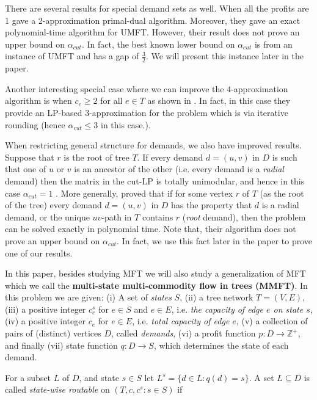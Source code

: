 There are several results for special demand sets as well. When all the profits are 1 \cite{Garg1997} gave a 2-approximation primal-dual algorithm. Moreover, they gave an exact polynomial-time algorithm for UMFT. However, their result does not prove an upper bound on $\alpha_{cut}$. In fact, the best known lower  bound on  $\alpha_{cut}$ is from an instance of UMFT and has a gap of $\frac{3}{2}$.  We will present this instance later in the paper. 

Another interesting special case where we can improve the $4$-approximation algorithm is when $c_e\geq 2$ for all $e\in T$ as shown in \cite{ojas1}. In fact, in this case they provide an LP-based $3$-approximation for the problem which is via iterative rounding (hence $\alpha_{cut}\leq 3$ in this case.). 

When restricting general structure for demands, we also have improved results. Suppose that $r$ is the root of tree $T$. If every demand $d=(u,v)$ in $D$ is such that one of $u$ or $v$ is an ancestor of the other (i.e. every demand is a \textit{radial} demand) then the matrix in the cut-LP is totally unimodular, and hence in this case $\alpha_{cut} =1$ \cite{IPbook}. More generally, \cite{ojas1} proved that if for some vertex $r$ of $T$ (as the root of the tree) every demand $d=(u,v)$ in $D$ has the property that $d$ is a radial demand, or the unique $uv$-path in $T$ contains $r$ (\textit{root} demand), then the problem can be solved exactly in polynomial time. Note that, their algorithm does not prove an upper bound on $\alpha_{cut}$. In fact, we use this fact later in the paper to prove one of our results.

In this paper, besides studying MFT we will also study a generalization of MFT which we call the \textbf{multi-state multi-commodity flow in trees (MMFT)}. 
 In this problem we are given: (i) A set of \textit{states} $S$, (ii) a tree network $T=(V,E)$, (iii) a positive integer $c^s_e$ for  $e\in S$ and $e\in E$, i.e. \textit{the capacity of edge $e$ on state $s$}, (iv) a positive integer $c_e$ for $e\in E$, i.e. \textit{total capacity of edge $e$}, (v) a collection of pairs of (distinct) vertices  $D$, called \textit{demands}, (vi) a profit function $p:D\rightarrow \mathbb{Z}^+$, and finally (vii) state function $q:D\rightarrow S$, which determines the state of each demand. 

For a subset $L$ of $D$, and state $s\in S$ let $L^s=\{d\in L: q(d)=s\}$. A set $L\subseteq D$ is called \textit{ state-wise routable} on $(T,c,c^s:s\in S)$ if 

